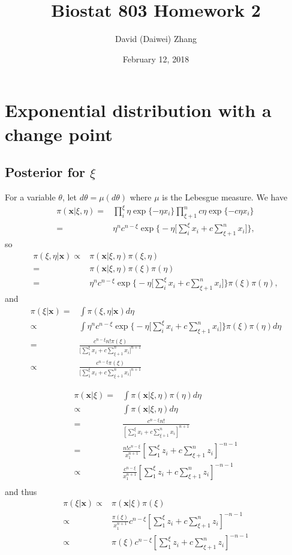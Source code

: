 \documentclass{article}
\title{Biostat 803 Homework 2}
\date{February 12, 2018}
\author{David (Daiwei) Zhang}
\begin{document}
\maketitle

\section{Exponential distribution with a change point}
\subsection{Posterior for $\xi$}
For a variable $\theta$, let $d\theta = \mu(d\theta)$
where $\mu$ is the Lebesgue measure.
We have
\begin{align*}
\pi(\boldsymbol{x} | \xi, \eta)
= & \prod_i^\xi \eta \exp\{ -\eta x_i \}
\prod_{\xi+1}^n c \eta \exp\{ -c \eta x_i \} \\
= & \eta^n c^{n - \xi} \exp\big\{ -\eta\Big[\sum_i^\xi x_i + c \sum_{\xi+1}^n x_i\Big]\Big\},
\end{align*}
so
\begin{align*}
  \pi(\xi, \eta | \bm{x})
  \propto & \pi(\bm{x} | \xi, \eta) \pi(\xi, \eta) \\
  = & \pi(\bm{x} | \xi, \eta) \pi(\xi) \pi(\eta) \\
  = & \eta^n c^{n - \xi} \exp\Big\{ -\eta\Big[\sum_i^\xi x_i + c \sum_{\xi+1}^n x_i\Big]\Big\} \pi(\xi) \pi(\eta),
\end{align*}
and
\begin{align*}
  \pi(\xi | \bm{x})
  = & \int \pi(\xi, \eta| \bm{x}) d\eta \\
  \propto & \int \eta^n c^{n - \xi} \exp\Big\{ -\eta\Big[\sum_i^\xi x_i + c \sum_{\xi+1}^n x_i\Big]\Big\} \pi(\xi) \pi(\eta) d\eta \\
  = & \frac{c^{n-\xi} n! \pi(\xi)}{\Big[\sum_1^\xi x_i + c\sum_{\xi+1}^n x_i\Big]^{n+1}}  \\
  \propto & \frac{c^{n-\xi} \pi(\xi)}{\Big[\sum_1^\xi x_i + c\sum_{\xi+1}^n x_i\Big]^{n+1}} 
\end{align*}

\begin{align*}
\pi(\boldsymbol{x} | \xi)
= & \int \pi(\boldsymbol{x} | \xi, \eta) \pi(\eta) d\eta \\
\propto & \int \pi(\boldsymbol{x} | \xi, \eta) d\eta \\
= & \frac{c^{n-\xi} n!}{[\sum_1^\xi x_i + c\sum_{\xi+1}^n x_i]^{n+1}} \\
= & \frac{n! c^{n-\xi}}{x_1^{n+1}} [\sum_1^\xi z_i + c\sum_{\xi+1}^n z_i]^{-n-1} \\
\propto & \frac{c^{n-\xi}}{x_1^{n+1}} [\sum_1^\xi z_i + c\sum_{\xi+1}^n z_i]^{-n-1} \\
\end{align*}
and thus
\begin{align*}
\pi(\xi | \boldsymbol{x})
  \propto & \pi(\boldsymbol{x} | \xi) \pi(\xi) \\
\propto & \frac{\pi(\xi)}{x_1^{n+1}} c^{n-\xi}[\sum_1^\xi z_i + c\sum_{\xi+1}^n z_i]^{-n-1} \\
\propto & \pi(\xi) c^{n-\xi}[\sum_1^\xi z_i + c\sum_{\xi+1}^n z_i]^{-n-1} 
\end{align*}
\end{document}
